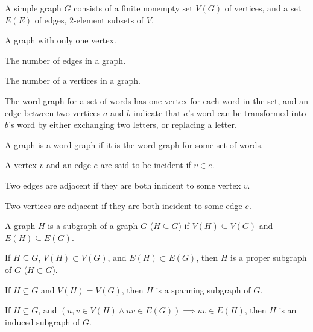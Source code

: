 \documentclass{article}
\begin{document}
\pagecolor{black}
\color{white}


    A simple graph $G$ consists of a finite nonempty set $V(G)$ of vertices, and a set $E(E)$ of edges, 2-element subsets of $V$.

\medskip{}

    A graph with only one vertex.

\medskip{}

    The number of edges in a graph.

\medskip{}

    The number of a vertices in a graph.

\medskip{}

    The word graph for a set of words has one vertex for each word in the set, and an edge between two vertices $a$ and $b$ indicate that $a$'s word can be transformed into $b$'s word by either exchanging two letters, or replacing a letter.

    A graph is a word graph if it is the word graph for some set of words.

\medskip{}

    A vertex $v$ and an edge $e$ are said to be incident if $v \in e$.

\medskip{}

    Two edges are adjacent if they are both incident to some vertex $v$.

\medskip{}

    Two vertices are adjacent if they are both incident to some edge $e$.

\medskip{}

    A graph $H$ is a subgraph of a graph $G$ ($H \subseteq G$) if $V(H) \subseteq V(G)$ and $E(H) \subseteq E(G)$.

    If $H \subseteq G$, $V(H) \subset V(G)$, and $E(H) \subset E(G)$, then $H$ is a proper subgraph of $G$ ($H \subset G$).

\medskip{}

    If $H \subseteq G$ and $V(H) = V(G)$, then $H$ is a spanning subgraph of $G$.

\medskip{}

    If $H \subseteq G$, and $(u,v \in V(H) \wedge uv \in E(G)) \implies uv \in E(H)$, then $H$ is an induced subgraph of $G$.
\end{document}

